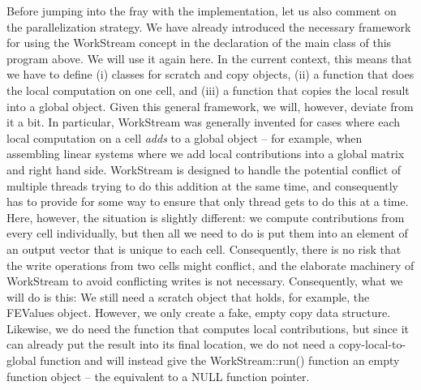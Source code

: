 Before jumping into the fray with the implementation, let us also comment on the parallelization strategy. We have already introduced the necessary framework for using the Work\+Stream concept in the declaration of the main class of this program above. We will use it again here. In the current context, this means that we have to define (i) classes for scratch and copy objects, (ii) a function that does the local computation on one cell, and (iii) a function that copies the local result into a global object. Given this general framework, we will, however, deviate from it a bit. In particular, Work\+Stream was generally invented for cases where each local computation on a cell {\itshape adds} to a global object -- for example, when assembling linear systems where we add local contributions into a global matrix and right hand side. Work\+Stream is designed to handle the potential conflict of multiple threads trying to do this addition at the same time, and consequently has to provide for some way to ensure that only thread gets to do this at a time. Here, however, the situation is slightly different\+: we compute contributions from every cell individually, but then all we need to do is put them into an element of an output vector that is unique to each cell. Consequently, there is no risk that the write operations from two cells might conflict, and the elaborate machinery of Work\+Stream to avoid conflicting writes is not necessary. Consequently, what we will do is this\+: We still need a scratch object that holds, for example, the F\+E\+Values object. However, we only create a fake, empty copy data structure. Likewise, we do need the function that computes local contributions, but since it can already put the result into its final location, we do not need a copy-\/local-\/to-\/global function and will instead give the Work\+Stream\+::run() function an empty function object -- the equivalent to a N\+U\+LL function pointer.



